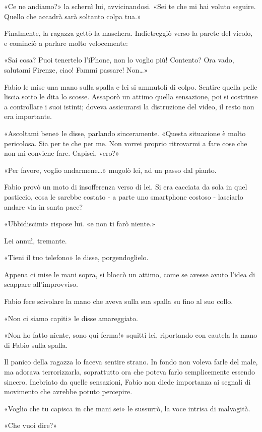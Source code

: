 «Ce ne andiamo?» la schernì lui, avvicinandosi. «Sei te che mi hai voluto seguire. Quello che accadrà sarà soltanto colpa tua.»

Finalmente, la ragazza gettò la maschera. Indietreggiò verso la parete del vicolo, e cominciò a parlare molto velocemente:

«Sai cosa? Puoi tenertelo l'iPhone, non lo voglio più! Contento? Ora vado, salutami Firenze, ciao! Fammi passare! Non\ldots»

Fabio le mise una mano sulla spalla e lei si ammutolì di colpo. Sentire quella pelle liscia sotto le dita lo scosse. Assaporò un attimo quella sensazione, poi si costrinse a controllare i suoi istinti; doveva assicurarsi la distruzione del video, il resto non era importante.

«Ascoltami bene» le disse, parlando sinceramente. «Questa situazione è molto pericolosa. Sia per te che per me. Non vorrei proprio ritrovarmi a fare cose che non mi conviene fare. Capisci, vero?»

«Per favore, voglio andarmene\ldots» mugolò lei, ad un passo dal pianto.

Fabio provò un moto di insofferenza verso di lei. Si era cacciata da sola in quel pasticcio, cosa le sarebbe costato - a parte uno smartphone costoso - lasciarlo andare via in santa pace?

«Ubbidiscimi» rispose lui. «e non ti farò niente.»

Lei annuì, tremante.

«Tieni il tuo telefono» le disse, porgendoglielo.

Appena ci mise le mani sopra, si bloccò un attimo, come se avesse avuto l'idea di scappare all'improvviso.

Fabio fece scivolare la mano che aveva sulla sua spalla su fino al suo collo.

«Non ci siamo capiti» le disse amareggiato.

«Non ho fatto niente, sono qui ferma!» squittì lei, riportando con cautela la mano di Fabio sulla spalla.

Il panico della ragazza lo faceva sentire strano. In fondo non voleva farle del male, ma adorava terrorizzarla, soprattutto ora che poteva farlo semplicemente essendo sincero. Inebriato da quelle sensazioni, Fabio non diede importanza ai segnali di movimento che avrebbe potuto percepire.

«Voglio che tu capisca in che mani sei» le sussurrò, la voce intrisa di malvagità.

«Che vuoi dire?»


